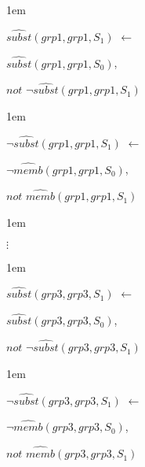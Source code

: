 \documentclass[global,twocolumn,final]{svjour}
\newenvironment{vexample}
  {\begin{example}\hspace{0.25em}}
  {\end{example}}
\newenvironment{vquote}
  {\begin{list}{}{\leftmargin 1em}\item[]}
  {\end{list}}
\begin{document}
\begin{vexample}
\begin{enumerate}
              \begin{vquote}
                $\hat{subst}(grp1, grp1, S_{1})$ $\leftarrow$

                \hspace{1em}
                $\hat{subst}(grp1, grp1, S_{0})$,

                \hspace{1em}
                $not$ $\lnot\hat{subst}(grp1, grp1, S_{1})$
              \end{vquote}

              \begin{vquote}
                $\lnot\hat{subst}(grp1, grp1, S_{1})$ $\leftarrow$

                \hspace{1em}
                $\lnot\hat{memb}(grp1, grp1, S_{0})$,

                \hspace{1em}
                $not$ $\hat{memb}(grp1, grp1, S_{1})$
              \end{vquote}

              \begin{vquote}
                \hspace{2em}$\vdots$
              \end{vquote}

              \begin{vquote}
                $\hat{subst}(grp3, grp3, S_{1})$ $\leftarrow$

                \hspace{1em}
                $\hat{subst}(grp3, grp3, S_{0})$,

                \hspace{1em}
                $not$ $\lnot\hat{subst}(grp3, grp3, S_{1})$
              \end{vquote}

              \begin{vquote}
                $\lnot\hat{subst}(grp3, grp3, S_{1})$ $\leftarrow$

                \hspace{1em}
                $\lnot\hat{memb}(grp3, grp3, S_{0})$,

                \hspace{1em}
                $not$ $\hat{memb}(grp3, grp3, S_{1})$
              \end{vquote}
          \end{enumerate}
        \end{vexample}
\end{document}
